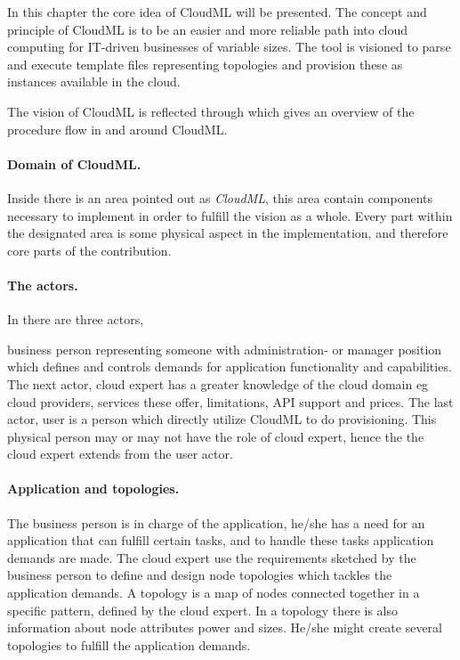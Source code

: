 

In this chapter the core idea of CloudML will be presented.
The concept and principle of CloudML is to be an easier and more reliable
path into cloud computing for IT-driven businesses of variable sizes.
The tool is visioned to parse and execute template files representing topologies
and provision these as instances available in the cloud. 

The vision of CloudML is reflected through  which gives
an overview of the procedure flow in and around CloudML.

\paragraph{Domain of CloudML.}

Inside  there is an area pointed out as \emph{CloudML},
this area contain components necessary to implement in order to fulfill
the vision as a whole.
Every part within the designated area is some physical aspect in the 
implementation, and therefore core parts of the contribution.

\paragraph{The actors.}

In  there are three actors,
\begin{ii}
  \iitem business person representing someone with administration- or manager position which
    defines and controls demands for application functionality and capabilities.
    The next actor,
  \iitem cloud expert has a greater knowledge of the cloud domain eg cloud providers,
    services these offer, limitations, API support and prices.
    The last actor,
  \iitem user is a person which directly utilize CloudML to do provisioning.
    This physical person may or may not have the role of cloud expert, 
    hence the the cloud expert extends from the user actor.
\end{ii}

\paragraph{Application and topologies.}

The business person is in charge of the application, he/she has a need
for an application that can fulfill certain tasks, and to handle these 
tasks application demands are made.
The cloud expert use the requirements sketched by the business person to 
define and design node topologies which tackles the application demands.
A topology is a map of nodes connected together in a specific pattern, 
defined by the cloud expert.
In a topology there is also information about node attributes 
\eg {} power and  sizes.
He/she might create several topologies to fulfill the application demands.

